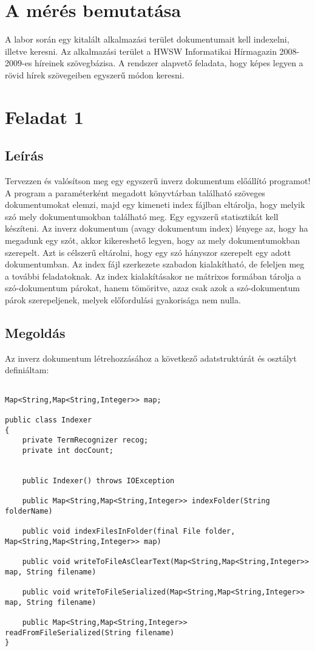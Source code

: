 
\section{A mérés bemutatása}
A labor során egy kitalált alkalmazási terület dokumentumait kell indexelni, illetve keresni. Az alkalmazási terület a HWSW Informatikai Hírmagazin 2008-2009-es híreinek szövegbázisa. A rendszer alapvető feladata, hogy képes legyen a rövid hírek szövegeiben egyszerű módon keresni.

\section{Feladat 1}
\subsection{Leírás}
Tervezzen és valósítson meg egy egyszerű inverz dokumentum előállító programot! A program a paraméterként megadott könyvtárban található szöveges dokumentumokat elemzi, majd egy kimeneti index fájlban eltárolja, hogy melyik szó mely dokumentumokban található meg.
Egy egyszerű statisztikát kell készíteni. Az inverz dokumentum (avagy dokumentum index) lényege az, hogy ha megadunk egy szót, akkor kikereshető legyen, hogy az mely dokumentumokban szerepelt. Azt is célszerű eltárolni, hogy egy szó hányszor szerepelt egy adott dokumentumban. Az index fájl szerkezete szabadon kialakítható, de feleljen meg a további feladatoknak. Az index kialakításakor ne mátrixos formában tárolja a szó-dokumentum párokat, hanem tömöritve, azaz csak azok a szó-dokumentum párok szerepeljenek, melyek előfordulási gyakorisága nem nulla.

\subsection{Megoldás}

Az inverz dokumentum létrehozzásához a következő adatstruktúrát és osztályt definiáltam:
\begin{lstlisting}[frame=single,float=!ht]

Map<String,Map<String,Integer>> map;

public class Indexer 
{
	private TermRecognizer recog;
	private int docCount;


	public Indexer() throws IOException
	
	public Map<String,Map<String,Integer>> indexFolder(String folderName)

	public void indexFilesInFolder(final File folder, Map<String,Map<String,Integer>> map) 

	public void writeToFileAsClearText(Map<String,Map<String,Integer>> map, String filename)
	
	public void writeToFileSerialized(Map<String,Map<String,Integer>> map, String filename)
		
	public Map<String,Map<String,Integer>> readFromFileSerialized(String filename)
}
\end{lstlisting}

